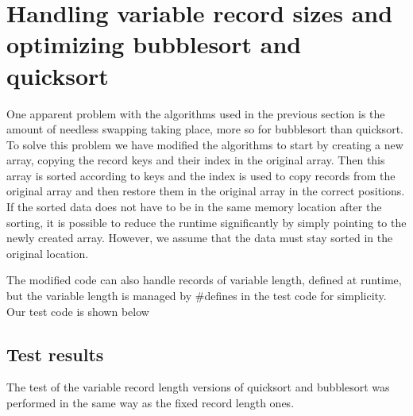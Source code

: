\section{Handling variable record sizes and optimizing bubblesort and quicksort}
One apparent problem with the algorithms used in the previous section is the amount of needless swapping taking place, more so
for bubblesort than quicksort. To solve this problem we have modified the algorithms to start by creating a new array, copying 
the record keys and their index in the original array. Then this array is sorted according to keys and the index is used to copy 
records from the original array and then restore them in the original array in the correct positions. If the sorted data does not have
to be in the same memory location after the sorting, it is possible to reduce the runtime significantly by simply pointing to the newly
created array. However, we assume that the data must stay sorted in the original location.

The modified code can also handle records of variable length, defined at runtime, but the variable length is managed by \#defines
in the test code for simplicity. Our test code is shown below

\subsection{Test results}
The test of the variable record length versions of quicksort and bubblesort was performed in the same way as the fixed record length ones.

